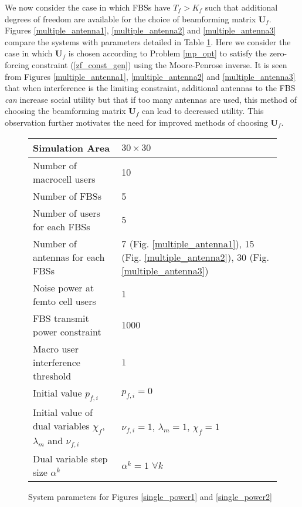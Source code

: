 We now consider the case in which FBSs have $T_f > K_f$ such that additional degrees of freedom are available for the choice of beamforming matrix $\mathbf{U}_f$. Figures \ref{multiple_antenna1}, \ref{multiple_antenna2} and \ref{multiple_antenna3} compare the systems with parameters detailed in Table \ref{table2}.
Here we consider the case in which $\mathbf{U}_f$ is chosen according to Problem \ref{mp_opt} to satisfy the zero-forcing constraint (\ref{zf_const_gen}) using the Moore-Penrose inverse. It is seen from Figures \ref{multiple_antenna1}, \ref{multiple_antenna2} and \ref{multiple_antenna3} that when interference is the limiting constraint, additional antennas to the FBS \emph{can} increase social utility but that if too many antennas are used, this method of choosing the beamforming matrix $\mathbf{U}_f$ can lead to decreased utility. This observation further motivates the need for improved methods of choosing $\mathbf{U}_f$.


\begin{center}
\begin{figure}[H]
\begin{tabular}{ | m{8cm} | m{5cm} | } 
\hline
Simulation Area & $30 \times 30$\\ 
\hline
Number of macrocell users & 10\\ 
\hline
Number of FBSs & 5\\ 
\hline
Number of users for each FBSs & 5\\ 
\hline
Number of antennas for each FBSs & 7 (Fig. \ref{multiple_antenna1}), 15 (Fig. \ref{multiple_antenna2}), 30 (Fig. \ref{multiple_antenna3})\\ 
\hline
Noise power at femto cell users & $1$\\ 
\hline
FBS transmit power constraint & 1000 \\ 
\hline
Macro user interference threshold & $1$\\ 
\hline
Initial value $p_{f,i}$ & $p_{f,i} = 0$\\
\hline
Initial value of dual variables $\chi_{f}$, $\lambda_{m}$ and $\nu_{f,i}$ & $\nu_{f,i}=1$, $\lambda_{m}=1 $, $\chi_{f}=1$\\
\hline
Dual variable step size $\alpha^k$& $\alpha^k= 1$ $\forall k$\\
\hline
\end{tabular}
\caption{System parameters for Figures \ref{single_power1} and \ref{single_power2}}
\label{table2}
\end{figure}
\end{center}


